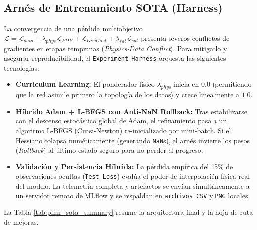 \documentclass[11pt,a4paper]{article}
\begin{document}
\subsection{Arnés de Entrenamiento SOTA (Harness)}
La convergencia de una pérdida multiobjetivo $\mathcal{L} = \mathcal{L}_{data} + \lambda_{phys} \mathcal{L}_{PDE} + \mathcal{L}_{Dirichlet} + \lambda_{sat} \mathcal{L}_{sat}$ presenta severos conflictos de gradientes en etapas tempranas (\textit{Physics-Data Conflict}). Para mitigarlo y asegurar reproducibilidad, el \texttt{Experiment Harness} orquesta las siguientes tecnologías:
\begin{itemize}
    \item \textbf{Curriculum Learning:} El ponderador físico $\lambda_{phys}$ inicia en $0.0$ (permitiendo que la red asimile primero la topología de los datos) y crece linealmente a $1.0$.
    \item \textbf{Híbrido Adam + L-BFGS con Anti-NaN Rollback:} Tras estabilizarse con el descenso estocástico global de Adam, el refinamiento pasa a un algoritmo L-BFGS (Cuasi-Newton) re-inicializado por mini-batch. Si el Hessiano colapsa numéricamente (generando \texttt{NaN}s), el arnés invierte los pesos (\textit{Rollback}) al último estado seguro para no perder el progreso.
    \item \textbf{Validación y Persistencia Híbrida:} La pérdida empírica del 15\% de observaciones ocultas (\texttt{Test\_Loss}) evalúa el poder de interpolación física real del modelo. La telemetría completa y artefactos se envían simultáneamente a un servidor remoto de MLflow y se respaldan en \texttt{archivos CSV} y \texttt{PNG} locales.
\end{itemize}
La Tabla \ref{tab:pinn_sota_summary} resume la arquitectura final y la hoja de ruta de mejoras.
\end{document}
